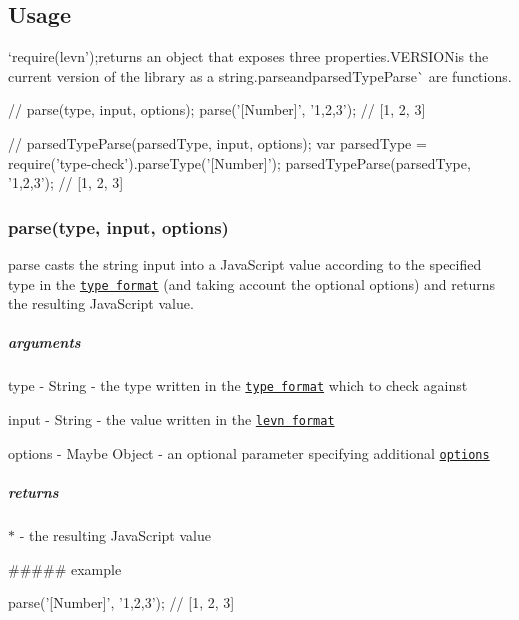  \subsection*{Usage}

`require(\textquotesingle{}levn');{\ttfamily returns an object that exposes three properties.}V\+E\+R\+S\+I\+ON{\ttfamily is the current version of the library as a string.}parse{\ttfamily and}parsed\+Type\+Parse\`{} are functions.


\begin{DoxyCode}
// parse(type, input, options);
parse('[Number]', '1,2,3'); // [1, 2, 3]

// parsedTypeParse(parsedType, input, options);
var parsedType = require('type-check').parseType('[Number]');
parsedTypeParse(parsedType, '1,2,3'); // [1, 2, 3]
\end{DoxyCode}


\subsubsection*{parse(type, input, options)}

{\ttfamily parse} casts the string {\ttfamily input} into a Java\+Script value according to the specified {\ttfamily type} in the \href{https://github.com/gkz/type-check#type-format}{\tt type format} (and taking account the optional {\ttfamily options}) and returns the resulting Java\+Script value.

\subparagraph*{arguments}


\begin{DoxyItemize}
\item type -\/ {\ttfamily String} -\/ the type written in the \href{https://github.com/gkz/type-check#type-format}{\tt type format} which to check against
\item input -\/ {\ttfamily String} -\/ the value written in the \href{#levn-format}{\tt levn format}
\item options -\/ {\ttfamily Maybe Object} -\/ an optional parameter specifying additional \href{#options}{\tt options}
\end{DoxyItemize}

\subparagraph*{returns}

{\ttfamily $\ast$} -\/ the resulting Java\+Script value

\#\#\#\#\# example 
\begin{DoxyCode}
parse('[Number]', '1,2,3'); // [1, 2, 3]
\end{DoxyCode}


